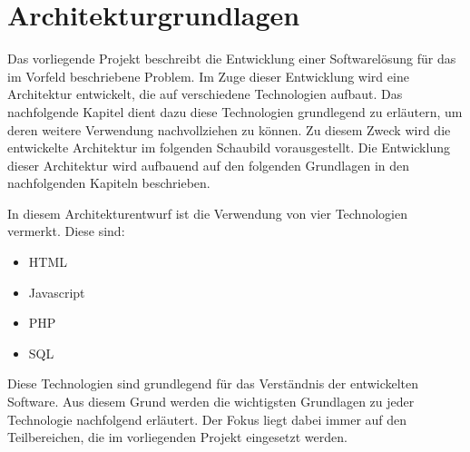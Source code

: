 \section{Architekturgrundlagen}
\label{sec:Architekturgrundlagen}

Das vorliegende Projekt beschreibt die Entwicklung einer Softwarelösung für das im Vorfeld beschriebene Problem.
Im Zuge dieser Entwicklung wird eine Architektur entwickelt, die auf verschiedene Technologien aufbaut.
Das nachfolgende Kapitel dient dazu diese Technologien grundlegend zu erläutern, um deren weitere Verwendung
nachvollziehen zu können. Zu diesem Zweck wird die entwickelte Architektur im folgenden Schaubild vorausgestellt.
Die Entwicklung dieser Architektur wird aufbauend auf den folgenden Grundlagen in den nachfolgenden Kapiteln beschrieben.



In diesem Architekturentwurf ist die Verwendung von vier Technologien vermerkt. Diese sind:
\begin{itemize}
  \item HTML
  \item Javascript
  \item PHP
  \item SQL
\end{itemize}

Diese Technologien sind grundlegend für das Verständnis der entwickelten Software.
Aus diesem Grund werden die wichtigsten Grundlagen zu jeder Technologie nachfolgend erläutert.
Der Fokus liegt dabei immer auf den Teilbereichen, die im vorliegenden Projekt eingesetzt werden.